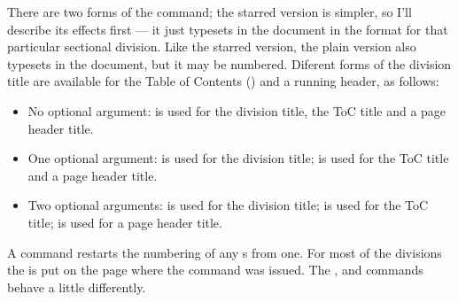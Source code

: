 There are two forms of the command; 
the starred version is simpler, so I'll describe its 
effects first --- it just typesets  in the document in the format
for that particular sectional division. Like the starred version, the plain
version also typesets  in the document, but it may be numbered.
Diferent forms of the division title are available for the 
Table of Contents (\toc) and a running header, as follows:
\begin{itemize}
\item No optional argument:  is used for the division title,
      the ToC title and a page header title.
\item One optional argument:  is used for the division title;
       is used for the ToC title and a page header title.
\item Two optional arguments:  is used for the division title;
       is used for the ToC title; 
      is used for a page header title.
\end{itemize}

A \cmd{\section} command restarts the numbering of any \cmd{\subsection}s
from one.
For most of the divisions the  is put on the page where the command
was issued. The \cmd{\book}, \cmd{\part} and \cmd{\chapter} commands behave 
a little differently.

